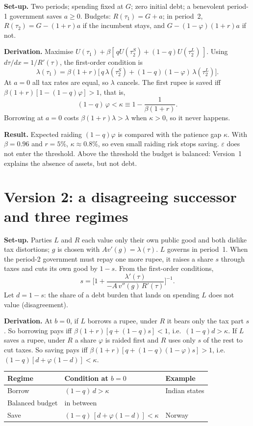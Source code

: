 \documentclass[11pt]{article}
\begin{document}
\textbf{Set-up.} Two periods; spending fixed at $G$; zero initial debt; a benevolent period-1 government saves $a\ge 0$. Budgets: $R(\tau_1)=G+a$; in period~2, $R(\tau_2)=G-(1+r)a$ if the incumbent stays, and $G-(1-\varphi)(1+r)a$ if not.

\textbf{Derivation.} Maximise $U(\tau_1)+\beta[\,qU(\tau_2^S)+(1-q)U(\tau_2^L)\,]$. Using $d\tau/dx=1/R'(\tau)$, the first-order condition is
\[
\lambda(\tau_1)=\beta(1+r)\big[\,q\,\lambda(\tau_2^{S})+(1-q)(1-\varphi)\,\lambda(\tau_2^{L})\big].
\]
At $a=0$ all tax rates are equal, so $\lambda$ cancels. The first rupee is saved iff $\beta(1+r)[1-(1-q)\varphi]>1$, that is,
\[
(1-q)\,\varphi<\kappa\equiv 1-\frac{1}{\beta(1+r)} .
\]
Borrowing at $a=0$ costs $\beta(1+r)\lambda>\lambda$ when $\kappa>0$, so it never happens.

\textbf{Result.} Expected raiding $(1-q)\varphi$ is compared with the patience gap $\kappa$. With $\beta=0.96$ and $r=5\%$, $\kappa\approx0.8\%$, so even small raiding risk stops saving. $\varepsilon$ does not enter the threshold. Above the threshold the budget is balanced: Version~1 explains the absence of assets, but not debt.

\section{Version 2: a disagreeing successor and three regimes}

\textbf{Set-up.} Parties $L$ and $R$ each value only their own public good and both dislike tax distortions; $g$ is chosen with $A v'(g)=\lambda(\tau)$. $L$ governs in period~1. When the period-2 government must repay one more rupee, it raises a share $s$ through taxes and cuts its own good by $1-s$. From the first-order conditions,
\[
s=\Big[1+\frac{\lambda'(\tau)}{-A\,v''(g)\,R'(\tau)}\Big]^{-1}.
\]
Let $d=1-s$: the share of a debt burden that lands on spending $L$ does not value (disagreement).

\textbf{Derivation.} At $b=0$, if $L$ borrows a rupee, under $R$ it bears only the tax part $s$. So borrowing pays iff $\beta(1+r)[q+(1-q)s]<1$, i.e.\ $(1-q)d>\kappa$. If $L$ saves a rupee, under $R$ a share $\varphi$ is raided first and $R$ uses only $s$ of the rest to cut taxes. So saving pays iff $\beta(1+r)[q+(1-q)(1-\varphi)s]>1$, i.e.\ $(1-q)[d+\varphi(1-d)]<\kappa$.

\begin{center}
\begin{tabular}{lll}
\toprule
Regime & Condition at $b=0$ & Example\\
\midrule
Borrow & $(1-q)\,d>\kappa$ & Indian states\\
Balanced budget & in between & \\
Save & $(1-q)\,[d+\varphi(1-d)]<\kappa$ & Norway\\
\bottomrule
\end{tabular}
\end{center}
\end{document}

